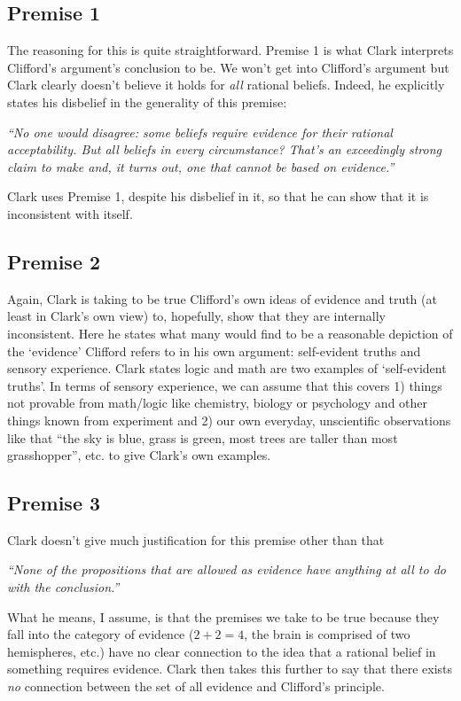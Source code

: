 \documentclass{article}
\begin{document}
\subsection{Premise 1}
The reasoning for this is quite straightforward. Premise 1 is what Clark interprets Clifford's argument's conclusion to be. We won't get into Clifford's argument but Clark clearly doesn't believe it holds for \textit{all} rational beliefs. Indeed, he explicitly states his disbelief in the generality of this premise:
\begin{displayquote}\textit{``No one would disagree: some beliefs require evidence for their rational acceptability. But \textnormal{all} beliefs in \textnormal{every} circumstance? That’s an exceedingly strong claim to make and, it turns out, one that cannot be based on evidence.''}
\end{displayquote}

Clark uses Premise 1, despite his disbelief in it, so that he can show that it is inconsistent with itself.

\subsection{Premise 2}
Again, Clark is taking to be true Clifford's own ideas of evidence and truth (at least in Clark's own view) to, hopefully, show that they are internally inconsistent. Here he states what many would find to be a reasonable depiction of the `evidence' Clifford refers to in his own argument: self-evident truths and sensory experience. Clark states logic and math are two examples of `self-evident truths'. In terms of sensory experience, we can assume that this covers 1) things not provable from math/logic like chemistry, biology or psychology and other things known from experiment and 2) our own everyday, unscientific observations like that ``the sky is blue, grass is green, most trees are taller than most grasshopper'', etc. to give Clark's own examples.

\subsection{Premise 3}
Clark doesn't give much justification for this premise other than that
\begin{displayquote}\textit{``None of the propositions that are allowed as evidence have anything at all to do with the conclusion.''}
\end{displayquote}

What he means, I assume, is that the premises we take to be true because they fall into the category of evidence ($2+2=4$, the brain is comprised of two hemispheres, etc.) have no clear connection to the idea that a rational belief in something requires evidence. Clark then takes this further to say that there exists \textit{no} connection between the set of all evidence and Clifford's principle.
\end{document}
